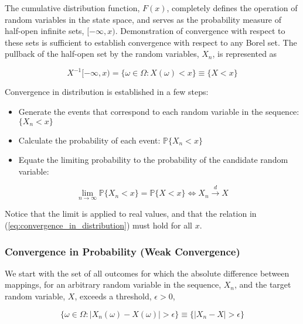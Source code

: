 \documentclass[12pt, twoside, draft]{article}
\begin{document}
The cumulative distribution function, $F(x)$, completely defines the operation of random variables in the state space, and serves as the probability measure of half-open infinite sets, $[-\infty, x)$.  Demonstration of convergence with respect to these sets is sufficient to establish convergence with respect to any Borel set.  The pullback of the half-open set by the random variables, $X_n$, is represented as

\begin{equation}
  X^{-1}[-\infty, x) = \{ \omega \in \Omega : X(\omega) < x \} \equiv \{ X < x \}
\end{equation}

Convergence in distribution is established in a few steps:
\begin{itemize}[noitemsep]
\item Generate the events that correspond to each random variable in the sequence: $\{ X_n < x \}$
\item Calculate the probability of each event: $\mathbb{P} \{ X_n < x \}$
\item Equate the limiting probability to the probability of the candidate random variable:
\end{itemize}
\begin{equation}\label{eq:convergence_in_distribution}
\lim_{n\rightarrow \infty} \mathbb{P}\{X_n < x\} = \mathbb{P}\{X < x\} \Leftrightarrow X_n \stackrel{d}{\longrightarrow} X
\end{equation}

Notice that the limit is applied to real values, and that the relation in (\ref{eq:convergence_in_distribution}) must hold for all $x$.

\subsubsection{Convergence in Probability (Weak Convergence)}\label{sec:convergence_in_probability}

We start with the set of all outcomes for which the absolute difference between mappings, for an arbitrary random variable in the sequence, $X_n$, and the target random variable, $X$, exceeds a threshold, $\epsilon > 0$,

\begin{equation}\label{eq:difference_set}
\{ \omega \in \Omega : |X_n(\omega) - X(\omega)| > \epsilon \} \equiv \{| X_n - X| > \epsilon \} 
\end{equation}
\end{document}
